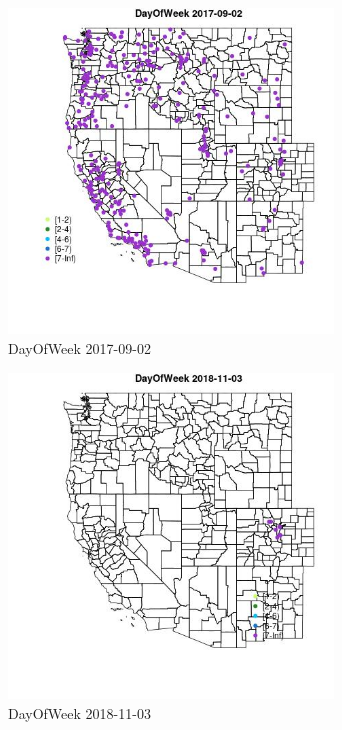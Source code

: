 \begin{figure} 
\centering  
\includegraphics[width=0.77\textwidth]{Code_Outputs/Report_ML_input_PM25_Step4_part_e_de_duplicated_aveswNAs_MapObsDayOfWeek2017-09-02.jpg} 
\caption{\label{fig:Report_ML_input_PM25_Step4_part_e_de_duplicated_aveswNAsMapObsDayOfWeek2017-09-02}DayOfWeek 2017-09-02} 
\end{figure} 
 

\begin{figure} 
\centering  
\includegraphics[width=0.77\textwidth]{Code_Outputs/Report_ML_input_PM25_Step4_part_e_de_duplicated_aveswNAs_MapObsDayOfWeek2018-11-03.jpg} 
\caption{\label{fig:Report_ML_input_PM25_Step4_part_e_de_duplicated_aveswNAsMapObsDayOfWeek2018-11-03}DayOfWeek 2018-11-03} 
\end{figure} 
 

